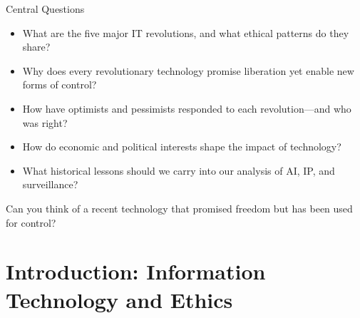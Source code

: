 \documentclass[aspectratio=169,11pt]{beamer}
\begin{document}

\begin{frame}{Central Questions}
\begin{itemize}
    \item What are the five major IT revolutions, and what ethical patterns do they share?
    \item Why does every revolutionary technology promise liberation yet enable new forms of control?
    \item How have optimists and pessimists responded to each revolution---and who was right?
    \item How do economic and political interests shape the impact of technology?
    \item What historical lessons should we carry into our analysis of AI, IP, and surveillance?
\end{itemize}

\vspace{0.3cm}
\begin{discussionbox}[Discussion]
Can you think of a recent technology that promised freedom but has been used for control?
\end{discussionbox}
\end{frame}

\section{Introduction: Information Technology and Ethics}
\end{document}
